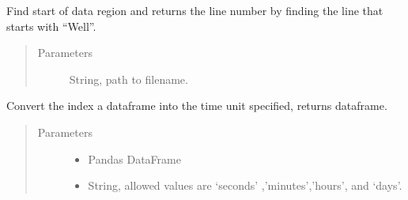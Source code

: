 \documentclass[letterpaper,10pt,english]{sphinxmanual}
\begin{document}

\begin{fulllineitems}
\label{\detokenize{platelib:platelib.plateread.search_start}}
Find start of data region and returns the line number by finding the line that starts with “Well”.
\begin{quote}\begin{description}
\item[{Parameters}] \leavevmode
{} \textendash{} String, path to filename.

\end{description}\end{quote}

\end{fulllineitems}


\begin{fulllineitems}
\label{\detokenize{platelib:platelib.plateread.to_time_units}}
Convert the index a dataframe into the time unit specified, returns dataframe.
\begin{quote}\begin{description}
\item[{Parameters}] \leavevmode\begin{itemize}
\item {} 
 \textendash{} Pandas DataFrame

\item {} 
 \textendash{} String, allowed values are ‘seconds’ ,’minutes’,’hours’, and ‘days’.

\end{itemize}

\end{description}\end{quote}

\end{fulllineitems}

\end{document}
